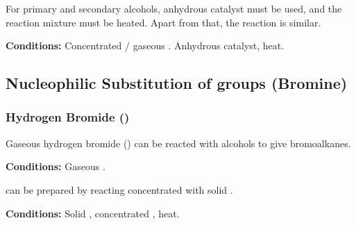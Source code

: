 				For primary and secondary alcohols, anhydrous  catalyst must be used, and the reaction mixture
				must be heated. Apart from that, the reaction is similar.

				\vspace{1.5em}
				\vbox{\textbf{Conditions:}	\tabto{35mm}Concentrated  / gaseous .
											\tabto{35mm}Anhydrous  catalyst, heat.}


		\pagebreak
		\subsection{Nucleophilic Substitution of  groups (Bromine)}

			\subsubsection{Hydrogen Bromide ()}

				Gaseous hydrogen bromide () can be reacted with alcohols to give bromoalkanes.

				\vspace{1.5em}
				\vbox{\textbf{Conditions:}	\tabto{35mm}Gaseous .}


				 can be prepared by reacting concentrated  with solid .

				\vspace{1.5em}
				\vbox{\textbf{Conditions:}	\tabto{35mm}Solid , concentrated , heat.}


